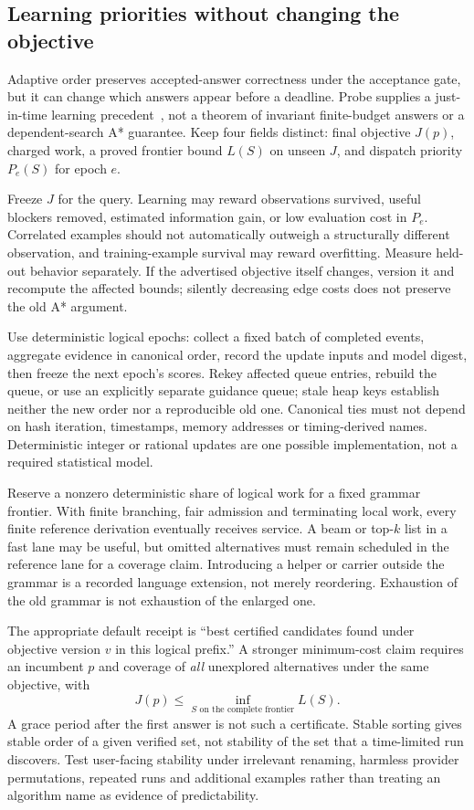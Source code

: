 \subsection{Learning priorities without changing the objective}
\label{sec:search-learning}

Adaptive order preserves accepted-answer correctness under the acceptance
gate, but it can change which answers appear before a deadline. Probe supplies
a just-in-time learning precedent~\cite{probe}, not a theorem of invariant
finite-budget answers or a dependent-search A* guarantee. Keep four fields
distinct: final objective $J(p)$, charged work, a proved frontier bound
$L(S)$ on unseen $J$, and dispatch priority $P_e(S)$ for epoch $e$.

Freeze $J$ for the query. Learning may reward observations survived, useful
blockers removed, estimated information gain, or low evaluation cost in
$P_e$. Correlated examples should not automatically outweigh a structurally
different observation, and training-example survival may reward overfitting.
Measure held-out behavior separately. If the advertised objective itself
changes, version it and recompute the affected bounds; silently decreasing
edge costs does not preserve the old A* argument.

Use deterministic logical epochs: collect a fixed batch of completed events,
aggregate evidence in canonical order, record the update inputs and model
digest, then freeze the next epoch's scores. Rekey affected queue entries,
rebuild the queue, or use an explicitly separate guidance queue; stale heap
keys establish neither the new order nor a reproducible old one. Canonical
ties must not depend on hash iteration, timestamps, memory addresses or
timing-derived names. Deterministic integer or rational updates are one
possible implementation, not a required statistical model.

Reserve a nonzero deterministic share of logical work for a fixed grammar
frontier. With finite branching, fair admission and terminating local work,
every finite reference derivation eventually receives service. A beam or
top-$k$ list in a fast lane may be useful, but omitted alternatives must remain
scheduled in the reference lane for a coverage claim. Introducing a helper
or carrier outside the grammar is a recorded language extension, not merely
reordering. Exhaustion of the old grammar is not exhaustion of the enlarged one.

The appropriate default receipt is ``best certified candidates found under
objective version $v$ in this logical prefix.'' A stronger minimum-cost claim
requires an incumbent $p$ and coverage of \emph{all} unexplored alternatives
under the same objective, with
\[
 J(p)\le\inf_{S\text{ on the complete frontier}}L(S).
\]
A grace period after the first answer is not such a certificate. Stable
sorting gives stable order of a given verified set, not stability of the set
that a time-limited run discovers. Test user-facing stability under irrelevant
renaming, harmless provider permutations, repeated runs and additional
examples rather than treating an algorithm name as evidence of predictability.

